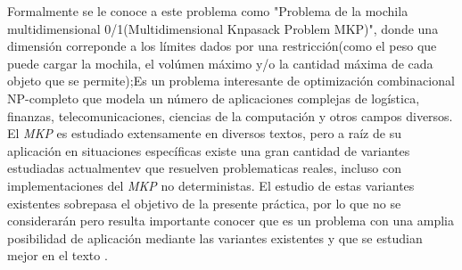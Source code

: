     Formalmente se le conoce a este problema como "Problema de la mochila multidimensional 0/1(Multidimensional Knpasack Problem MKP)", donde una dimensión correponde a los límites dados por una restricción(como el peso que puede cargar la mochila, el volúmen máximo y/o la cantidad máxima de cada objeto que se permite);Es un problema interesante de optimización combinacional NP-completo que modela un número de aplicaciones complejas de logística, finanzas, telecomunicaciones, ciencias de la computación y otros campos diversos. El \textit{MKP} es estudiado extensamente en diversos textos, pero a raíz de su aplicación en situaciones específicas existe una gran cantidad de variantes estudiadas actualmentev que resuelven problematicas reales, incluso con implementaciones del \textit{MKP} no deterministas. El estudio de estas variantes existentes sobrepasa el objetivo de la presente práctica, por lo que no se considerarán pero resulta importante conocer que es un problema con una amplia posibilidad de aplicación mediante las variantes existentes y que se estudian mejor en el texto \cite{MKPV}.